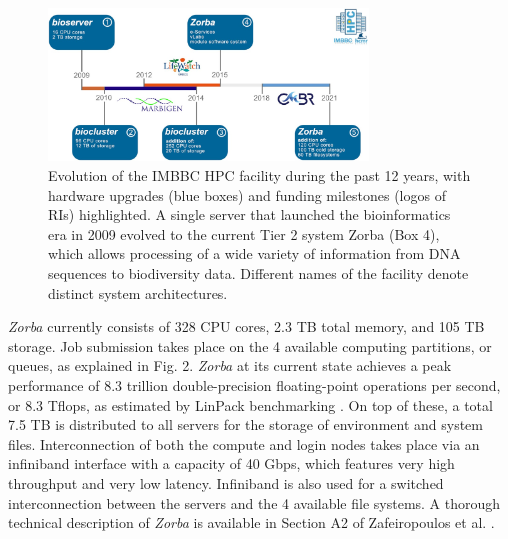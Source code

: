    \begin{figure}
      \centering
      \includegraphics[width=85mm]{figures/imbbc_hpc_facility.jpeg}
      \caption[The IMBBC HPC facility history]{
         Evolution of the IMBBC HPC facility during the past 12 years, with hardware upgrades (blue boxes) and funding milestones (logos of RIs) highlighted. 
         A single server that launched the bioinformatics era in 2009 evolved to the current Tier 2 system Zorba (Box 4), which allows processing of a wide variety of information from DNA sequences to biodiversity data. 
         Different names of the facility denote distinct system architectures.
      }
   \end{figure}



   \textit{Zorba} currently consists of 328 CPU cores, 2.3 TB total memory, and 105 TB storage. 
   Job submission takes place on the 4 available computing partitions, or queues, as explained in Fig. 2. \textit{Zorba} at its current state achieves a peak performance of 8.3 trillion double-precision floating-point operations per second, or 8.3 Tflops, as estimated by LinPack benchmarking \citep{dongarra2003linpack}. 
   On top of these, a total 7.5 TB is distributed to all servers for the storage of environment and system files. 
   Interconnection of both the compute and login nodes takes place via an infiniband interface with a capacity of 40 Gbps, which features very high throughput and very low latency. 
   Infiniband is also used for a switched interconnection between the servers and the 4 available file systems. 
   A thorough technical description of \textit{Zorba} is available in Section A2 of Zafeiropoulos et al.  \citep{haris_zafeiropoulos_2021_4665308}.


